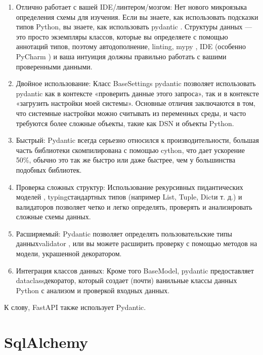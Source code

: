 \documentclass{altsu-report}
\begin{document}
\begin{enumerate}
    \item Отлично работает с вашей IDE/линтером/мозгом: Нет нового микроязыка определения схемы для изучения. Если вы знаете, как использовать подсказки типов Python, вы знаете, как использовать pydantic . Структуры данных — это просто экземпляры классов, которые вы определяете с помощью аннотаций типов, поэтому автодополнение, linting, mypy , IDE (особенно PyCharm ) и ваша интуиция должны правильно работать с вашими проверенными данными.

    \item Двойное использование: Класс BaseSettings pydantic позволяет использовать pydantic как в контексте «проверить данные этого запроса», так и в контексте «загрузить настройки моей системы». Основные отличия заключаются в том, что системные настройки можно считывать из переменных среды, и часто требуются более сложные объекты, такие как DSN и объекты Python.

    \item Быстрый: Pydantic всегда серьезно относился к производительности, большая часть библиотеки скомпилирована с помощью cython, что дает ускорение ~ 50\%, обычно это так же быстро или даже быстрее, чем у большинства подобных библиотек.

    \item Проверка сложных структур: Использование рекурсивных пидантических моделей , typingстандартных типов (например List, Tuple, Dictи т. д.) и валидаторов позволяет четко и легко определять, проверять и анализировать сложные схемы данных.

    \item Расширяемый: Pydantic позволяет определять пользовательские типы данныхvalidator , или вы можете расширить проверку с помощью методов на модели, украшенной декоратором.
    
    \item Интеграция классов данных: Кроме того BaseModel, pydantic предоставляет dataclassдекоратор, который создает (почти) ванильные классы данных Python с анализом и проверкой входных данных.
\end{enumerate}

К слову, FastAPI также использует Pydantic.

\section*{SqlAlchemy}
\end{document}
